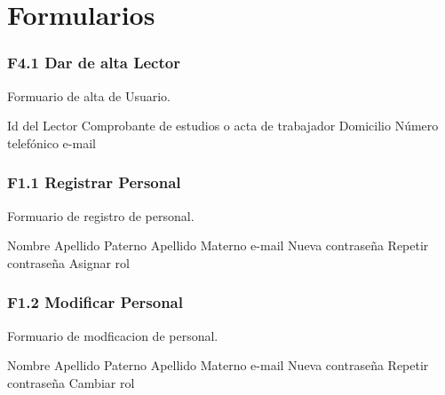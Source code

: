 \chapter{Formularios}
\label{appendix:Formularios}

\subsection{F4.1 Dar de alta Lector }
  Formuario de alta de Usuario.\\

	\begin{UClist}
      \UCli Id del Lector
      \UCli Comprobante de estudios o acta de trabajador
      \UCli Domicilio
      \UCli Número telefónico
      \UCli e-mail
    \end{UClist}

\subsection{F1.1 Registrar Personal }
  Formuario de registro de personal.\\

  \begin{UClist}
      \UCli Nombre
      \UCli Apellido Paterno
      \UCli Apellido Materno
      \UCli e-mail
      \UCli Nueva contraseña
      \UCli Repetir contraseña
      \UCli Asignar rol 
    \end{UClist}

\subsection{F1.2 Modificar Personal }
  Formuario de modficacion de personal.\\

  \begin{UClist}
      \UCli Nombre
      \UCli Apellido Paterno
      \UCli Apellido Materno
      \UCli e-mail
      \UCli Nueva contraseña
      \UCli Repetir contraseña
      \UCli Cambiar rol 
    \end{UClist}





